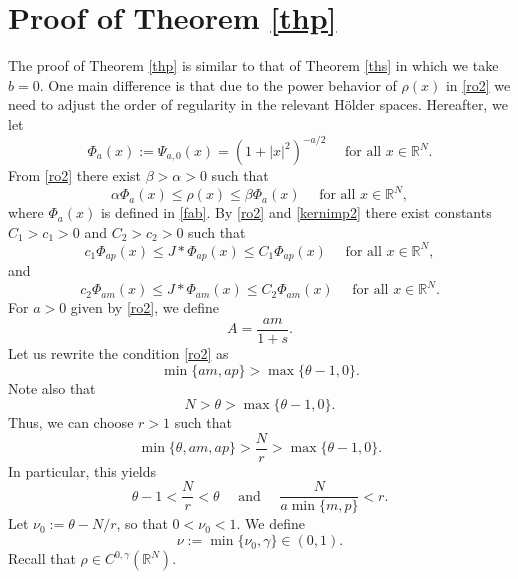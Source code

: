 \documentclass[leqno,12pt]{article}
\newcommand{\R}{\mathbb R}
\numberwithin{equation}{section}
\begin{document}
\section{Proof of Theorem \ref{thp}}



The proof of Theorem \ref{thp} is similar to that of Theorem \ref{ths} in which we take $b=0$. One main difference is that due to the power behavior of $\rho(x)$  in \eqref{ro2} we need to adjust the order of regularity in the relevant H\"older spaces.
Hereafter, we let 
\begin{equation}\label{fi}
\Phi_a(x):=\Psi_{a,0}(x)=(1+|x|^2)^{-a/2} \quad\mbox{ for all }x\in \R^N.
\end{equation} 
From \eqref{ro2} there exist  $\beta>\alpha>0$ such that 
\begin{equation}\label{ro12}
\alpha \Phi_{a}(x)\leq \rho(x)\leq \beta \Phi_{a}(x)\quad\mbox{ for all }x\in \R^N,
\end{equation}
where $\Phi_{a}(x)$ is defined in \eqref{fab}.
By \eqref{ro2} and \eqref{kernimp2} there exist constants $C_1>c_1>0$ and $C_2>c_2>0$ such that
\begin{equation}\label{mj12}
c_1\Phi_{ap}(x) \leq J*\Phi_{ap}(x)\leq C_1 \Phi_{ap}(x) \quad\mbox{ for all }x\in \R^N,
\end{equation}
and
\begin{equation}\label{mj22}
c_2\Phi_{am}(x) \leq J*\Phi_{am}(x)\leq C_2 \Phi_{am}(x) \quad\mbox{ for all }x\in \R^N.
\end{equation}
For $a> 0$ given by \eqref{ro2}, we define
$$
A=\frac{am}{1+s}.
$$
Let us rewrite the condition \eqref{ro2} as 
$$
\min\{am, ap\}>\max\{\theta-1, 0\}.
$$
Note also that 
$$N>\theta>\max\{\theta-1, 0\}.
$$
Thus, we can choose $r>1$ such that 
\begin{equation}\label{t1}
\min\Big\{ \theta, am, ap\Big\}>\frac{N}{r}>\max\{\theta-1, 0\}.  
\end{equation}
In particular, this yields
\begin{equation}\label{t2}
\theta-1<\frac{N}{r}<\theta \quad \text{ and }\quad \frac{N}{a\min\{m,p\}}<r.
\end{equation}
Let $\nu_0:=\theta-N/r$, so that $0<\nu_0<1$.
We define
\begin{equation}\label{nana}
\nu:=\min\{\nu_0,\gamma\}\in (0,1).
\end{equation}
Recall that $\rho\in C^{0,\gamma}(\R^N)$.
\end{document}
